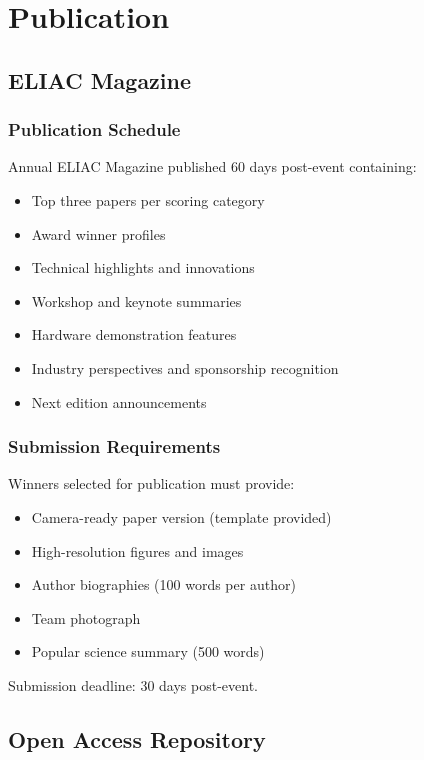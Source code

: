 
\renewcommand{\thesection}{PU}
\section{Publication}

\subsection{ELIAC Magazine}

\subsubsection{Publication Schedule}
Annual ELIAC Magazine published 60 days post-event containing:
\begin{itemize}[noitemsep]
    \item Top three papers per scoring category
    \item Award winner profiles
    \item Technical highlights and innovations
    \item Workshop and keynote summaries
    \item Hardware demonstration features
    \item Industry perspectives and sponsorship recognition
    \item Next edition announcements
\end{itemize}

\subsubsection{Submission Requirements}
Winners selected for publication must provide:
\begin{itemize}[noitemsep]
    \item Camera-ready paper version (template provided)
    \item High-resolution figures and images
    \item Author biographies (100 words per author)
    \item Team photograph
    \item Popular science summary (500 words)
\end{itemize}

Submission deadline: 30 days post-event.

\subsection{Open Access Repository}

